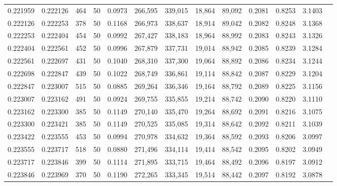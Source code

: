 \begin{tabular}{rrrrrrrrrrrrr}
0.221959 & 0.222126 &   464 &  50 &                                     0.0973 & 266,595 & 339,015 &  18,864 &  89,092 & 0.2081 & 0.8253 & 3.1403 \\
0.222126 & 0.222253 &   378 &  50 &                                     0.1168 & 266,973 & 338,637 &  18,914 &  89,042 & 0.2082 & 0.8248 & 3.1368 \\
0.222253 & 0.222404 &   454 &  50 &                                     0.0992 & 267,427 & 338,183 &  18,964 &  88,992 & 0.2083 & 0.8243 & 3.1326 \\
0.222404 & 0.222561 &   452 &  50 &                                     0.0996 & 267,879 & 337,731 &  19,014 &  88,942 & 0.2085 & 0.8239 & 3.1284 \\
0.222561 & 0.222697 &   431 &  50 &                                     0.1040 & 268,310 & 337,300 &  19,064 &  88,892 & 0.2086 & 0.8234 & 3.1244 \\
0.222698 & 0.222847 &   439 &  50 &                                     0.1022 & 268,749 & 336,861 &  19,114 &  88,842 & 0.2087 & 0.8229 & 3.1204 \\
0.222847 & 0.223007 &   515 &  50 &                                     0.0885 & 269,264 & 336,346 &  19,164 &  88,792 & 0.2089 & 0.8225 & 3.1156 \\
0.223007 & 0.223162 &   491 &  50 &                                     0.0924 & 269,755 & 335,855 &  19,214 &  88,742 & 0.2090 & 0.8220 & 3.1110 \\
0.223162 & 0.223300 &   385 &  50 &                                     0.1149 & 270,140 & 335,470 &  19,264 &  88,692 & 0.2091 & 0.8216 & 3.1075 \\
0.223300 & 0.223421 &   385 &  50 &                                     0.1149 & 270,525 & 335,085 &  19,314 &  88,642 & 0.2092 & 0.8211 & 3.1039 \\
0.223422 & 0.223555 &   453 &  50 &                                     0.0994 & 270,978 & 334,632 &  19,364 &  88,592 & 0.2093 & 0.8206 & 3.0997 \\
0.223555 & 0.223717 &   518 &  50 &                                     0.0880 & 271,496 & 334,114 &  19,414 &  88,542 & 0.2095 & 0.8202 & 3.0949 \\
0.223717 & 0.223846 &   399 &  50 &                                     0.1114 & 271,895 & 333,715 &  19,464 &  88,492 & 0.2096 & 0.8197 & 3.0912 \\
0.223846 & 0.223969 &   370 &  50 &                                     0.1190 & 272,265 & 333,345 &  19,514 &  88,442 & 0.2097 & 0.8192 & 3.0878 \\

\end{tabular}
